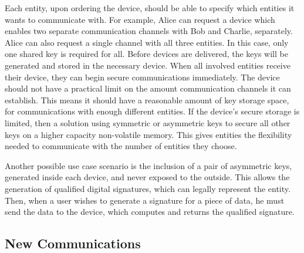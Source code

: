 Each entity, upon ordering the device, should be able to specify which entities it wants to communicate with.
For example, Alice can request a device which enables two separate communication channels with Bob and Charlie, separately. Alice can also request a single channel with all three entities. In this case, only one shared key is required for all.
Before devices are delivered, the keys will be generated and stored in the necessary device. When all involved entities receive their device, they can begin secure communications immediately.
The device should not have a practical limit on the amount communication channels it can establish. This means it should have a reasonable amount of key storage space, for communications with enough different entities.
If the device's secure storage is limited, then a solution using symmetric or asymmetric keys to secure all other keys on a higher capacity non-volatile memory.
This gives entities the flexibility needed to communicate with the number of entities they choose.

Another possible use case scenario is the inclusion of a pair of asymmetric keys, generated inside each device, and never exposed to the outside. This allows the generation of qualified digital signatures, which can legally represent the entity.
Then, when a user wishes to generate a signature for a piece of data, he must send the data to the device, which computes and returns the qualified signature.


\subsection{New Communications}\label{chap:problem:scenarios:keys}

